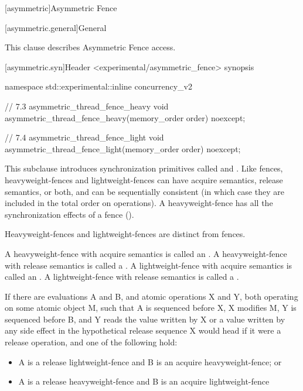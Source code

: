 
[asymmetric]{Asymmetric Fence}

[asymmetric.general]{General}

This clause describes Asymmetric Fence access. 


[asymmetric.syn]{Header <experimental/asymmetric_fence> synopsis}


\begin{codeblock}
namespace std::experimental::inline concurrency_v2 {

// 7.3 asymmetric_thread_fence_heavy
void asymmetric_thread_fence_heavy(memory_order order) noexcept;

// 7.4 asymmetric_thread_fence_light
void asymmetric_thread_fence_light(memory_order order) noexcept;
}
\end{codeblock}

\pnum

This subclause introduces synchronization primitives called  and
. Like fences, heavyweight-fences and lightweight-fences can have acquire
semantics, release semantics, or both, and can be sequentially consistent (in which case they
are included in the total order  on  operations).
A heavyweight-fence has all the
synchronization effects of a fence (). \begin{note}  Heavyweight-fences and
lightweight-fences are distinct from fences.\end{note}

\pnum
A heavyweight-fence with acquire semantics is called an . A
heavyweight-fence with release semantics is called a . A
lightweight-fence with acquire semantics is called an . A
lightweight-fence with release semantics is called a .

\pnum
If there are evaluations A and B, and atomic operations X and Y, both operating on some atomic
object M, such that A is sequenced before X, X modifies M, Y is sequenced before B, and Y
reads the value written by X or a value written by any side effect in the hypothetical release
sequence X would head if it were a release operation, and one of the following hold:
\begin{itemize}
    \item  A is a release lightweight-fence and B is an acquire heavyweight-fence; or
\item  A is a release heavyweight-fence and B is an acquire lightweight-fence
\end{itemize}

